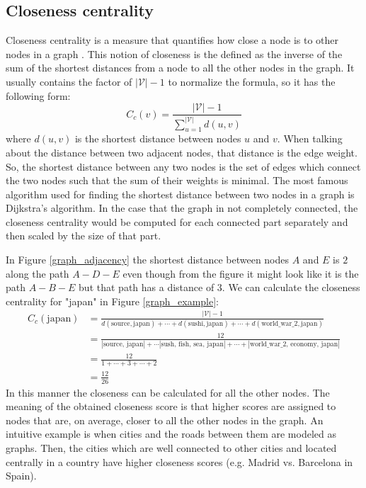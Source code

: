 \documentclass[12pt]{article}
\numberwithin{equation}{section}
\begin{document}
\begin{spacing}{1.5}
	\subsection{Closeness centrality}
	Closeness centrality is a measure that quantifies how close a node is to other nodes in a graph \cite{bavelas}. This notion of closeness is the defined as the inverse of the sum of the shortest distances from a node to all the other nodes in the graph. It usually contains the factor of $|\mathcal{V}|-1$ to normalize the formula, so it has the following form:
	\begin{equation}
		C_c(v) = \frac{|\mathcal{V}|-1}{\sum_{u=1}^{|\mathcal{V}|} d(u,v)}
	\end{equation}
	where $d(u,v)$ is the shortest distance between nodes $u$ and $v$. When talking about the distance between two adjacent nodes, that distance is the edge weight. So, the shortest distance between any two nodes is the set of edges which connect the two nodes such that the sum of their weights is minimal. The most famous algorithm used for finding the shortest distance between two nodes in a graph is Dijkstra's algorithm. In the case that the graph in not completely connected, the closeness centrality would be computed for each connected part separately and then scaled by the size of that part. 
	
	In Figure \ref{graph_adjacency} the shortest distance between nodes $A$ and $E$ is $2$ along the path $A - D - E$ even though from the figure it might look like it is the path $A - B - E$ but that path has a distance of $3$. We can calculate the closeness centrality for "japan" in Figure \ref{graph_example}: 
	\begin{equation*}
		\begin{split}
			C_c(\text{japan}) & = \frac{|\mathcal{V}|-1}{d(\text{source},\text{japan}) + \cdots + d(\text{sushi},\text{japan}) + \cdots + d(\text{world\_war\_2},\text{japan})} \\
			& = \frac{12}{|\text{source, japan}| + \cdots |\text{sush, fish, sea,  japan}| + \cdots + |\text{world\_war\_2, economy, japan}|} \\
			& = \frac{12}{1 + \cdots + 3 + \cdots + 2} \\
			& = \frac{12}{26}
		\end{split}
	\end{equation*}
	In this manner the closeness can be calculated for all the other nodes. The meaning of the obtained closeness score is that higher scores are assigned to nodes that are, on average, closer to all the other nodes in the graph. An intuitive example is when cities and the roads between them are modeled as graphs. Then, the cities which are well connected to other cities and located centrally in a country have higher closeness scores (e.g. Madrid vs. Barcelona in Spain).  
	

\end{spacing}
\end{document}
